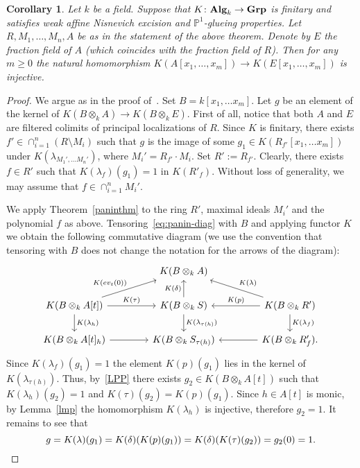 \documentclass[oneside, 11pt]{amsart}
\numberwithin{equation}{section}
\newtheorem{corollary}[lemma]{Corollary}
\theoremstyle{definition}
\theoremstyle{definition}
\theoremstyle{remark}
\newcommand{\catname}[1]{{\normalfont\textbf{#1}}} %
\begin{document}
\begin{corollary}
\label{esssmooth}
Let $k$ be a field.
Suppose that $K\colon\catname{Alg}_k\rightarrow\catname{Grp}$ is finitary and satisfies weak affine Nisnevich excision and $\mathbb{P}^1$-glueing properties. Let $R, M_1, \ldots, M_n, A$ be as in the statement of the above theorem. Denote by $E$ the fraction field of $A$ {\rm(}which coincides with the fraction field of $R${\rm)}.
Then for any $m\geq 0$ the natural homomorphism $K(A[x_1,\ldots, x_m])\to K(E[x_1,\ldots,x_m])$ is injective.
\end{corollary}
\begin{proof}
We argue as in the proof of~\cite[Theorem~3.2]{Sta20}. Set $B=k[x_1,\ldots x_m]$. Let $g$ be an element of the kernel of $K(B \otimes_k A)\rightarrow K(B \otimes_k E)$. First of all, notice that both $A$ and $E$ are filtered colimits of principal localizations of $R$. Since $K$ is finitary, there exists $f' \in \cap_{i=1}^n(R \setminus M_i)$ such that $g$ is the image of some $g_1 \in K(R_{f'}[x_1,\ldots x_m])$ under $K(\lambda_{M_1',\ldots M_n'})$, where $M_i' = R_{f'} \cdot M_i$. Set $R' := R_{f'}$.
Clearly, there exists $f \in R'$ such that $K(\lambda_{f})(g_1) = 1$ in $K(R'_{f})$. 
Without loss of generality, we may assume that $f \in \cap_{i=1}^n M_i'$. 

We apply Theorem~\ref{paninthm} to the ring $R'$, maximal ideals $M_i'$ and the polynomial $f$ as above.
Tensoring~\eqref{eq:panin-diag} with $B$ and applying functor $K$ we obtain the following commutative diagram (we use the convention that tensoring with $B$ does not change the notation for the arrows of the diagram):
\begin{equation*} 
 \begin{tikzcd}[column sep=4em]
   & K(B \otimes_k A) & \\ 
   K(B \otimes_k A[t]) \ar{d}{K(\lambda_h)} \ar{ru}{K(ev_t(0))} \ar{r}{K(\tau)} & K(B \otimes_k S) \ar{u}{K(\delta)} \ar{d}{K(\lambda_{\tau(h)})}  & K(B \otimes_k R') \ar{ul}[swap]{K(\lambda)} \ar{d}{K(\lambda_f)} \ar{l}[swap]{K(p)} \\
   K(B \otimes_k A[t]_h) \ar{r}[swap]{}              & K(B \otimes_k S_{\tau(h)})      & K(B \otimes_k R'_f). \ar{l}{}\end{tikzcd}
\end{equation*}
Since $K(\lambda_f)(g_1) = 1$ the element $K(p)(g_1)$ lies in the kernel of $K(\lambda_{\tau(h)})$. Thus, by~\ref{LPP} there exists $g_2\in K(B \otimes_k A[t])$ such that $K(\lambda_h)(g_2)=1$ and $K(\tau)(g_2)=K(p)(g_1)$. Since $h \in A[t]$ is monic, by Lemma~\ref{lmp} the homomorphism $K(\lambda_h)$ is injective, therefore $g_2=1$. It remains to see that
$$g=K(\lambda)(g_1)=K(\delta)(K(p)(g_1))=K(\delta)(K(\tau)(g_2))=g_2(0)=1.\qedhere$$
\end{proof}
\end{document}
